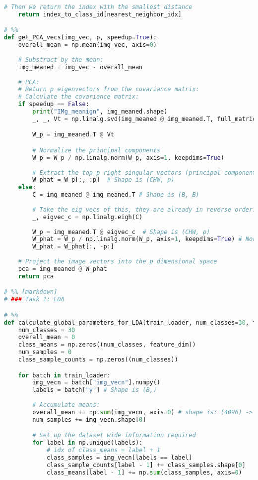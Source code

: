 \documentclass{article}
\begin{document}
\begin{lstlisting}[language=Python]
    # Then we return the index with the smallest distance
    return index_to_class_id[nearest_neighbor_idx]

# %%
def get_PCA_vecs(img_vec, p, speedup=True):
    overall_mean = np.mean(img_vec, axis=0)
    
    # Substract by the mean:
    img_meaned = img_vec - overall_mean
    
    # PCA: 
    # Return p eigenvectors from the covariance matrix:
    # Calculate the covariance matrix:
    if speedup == False:
        print("IMg_meanign", img_meaned.shape)
        _, _, Vt = np.linalg.svd(img_meaned @ img_meaned.T, full_matrices=False) 

        W_p = img_meaned.T @ Vt

        # Normalize the principal components
        W_p = W_p / np.linalg.norm(W_p, axis=1, keepdims=True)        
        
        # Extract the top-p right singular vectors (principal components)
        W_phat = W_p[:, :p]  # Shape is (CHW, p)
    else:
        C = img_meaned @ img_meaned.T # Shape is (B, B)
        
        # Take the eig vecs of this, they are already in reverse order:
        _, eigvec_c = np.linalg.eigh(C)
        
        W_p = img_meaned.T @ eigvec_c  # Shape is (CHW, p)
        W_phat = W_p / np.linalg.norm(W_p, axis=1, keepdims=True) # Normalized
        W_phat = W_phat[:, -p:]
    
    # Project the image vectors into the p dimensional space
    pca = img_meaned @ W_phat
    return pca

# %% [markdown]
# ### Task 1: LDA

# %%
def calculate_global_parameters_for_LDA(train_loader, num_classes=30, feature_dim=4096):  
    num_classes = 30
    overall_mean = 0
    class_means = np.zeros((num_classes, feature_dim))
    num_samples = 0
    class_sample_counts = np.zeros((num_classes))

    for batch in train_loader:
        img_vecn = batch["img_vecn"].numpy()
        labels = batch["y"] # Shape is (B,)
        
        # Accumulate means:
        overall_mean += np.sum(img_vecn, axis=0) # shape is: (4096) -> (CHW)
        num_samples += img_vecn.shape[0]

        # Set up the dataset wide information required
        for label in np.unique(labels):
            # idx of class_means = label + 1
            class_samples = img_vecn[labels == label]
            class_sample_counts[label - 1] += class_samples.shape[0]
            class_means[label - 1] += np.sum(class_samples, axis=0)


\end{lstlisting}
\end{document}
